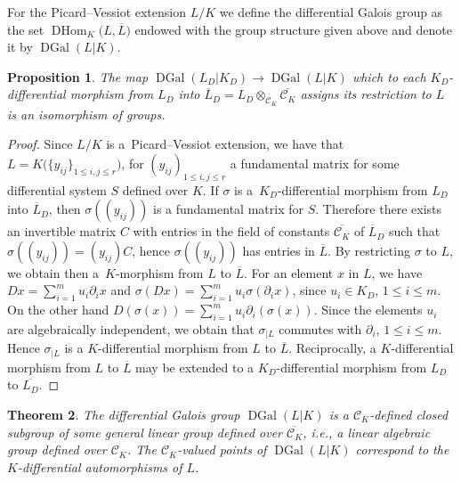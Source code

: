 \documentclass[pdftex]{sigma}%
\numberwithin{equation}{section}
\newtheorem{Theorem}{Theorem}[section]
\newtheorem{Proposition}[Theorem]{Proposition}
 { \theoremstyle{definition}
\newtheorem{Definition}[Theorem]{Definition}
\newtheorem{Note}[Theorem]{Note}
\newtheorem{Example}[Theorem]{Example}
\newtheorem{examples}[Theorem]{Examples}
\newtheorem{Remark}[Theorem]{Remark} }
\def \DGal{\operatorname{DGal}}
\def \DHom{\operatorname{DHom}}
\begin{document}
\begin{Definition} For the Picard--Vessiot extension $L/K$ we define the differential Galois group as the set $\DHom_K\big(L,\overline{L}\big)$ endowed with the group structure given above and denote it by $\DGal(L|K)$.
\end{Definition}

\begin{Proposition}\label{groups}
The map $\DGal(L_D|K_D) \rightarrow \DGal(L|K)$ which to each
$K_D$-differential morphism from $L_D$ into $\overline{L}_D=L_D\otimes_{\mathcal{C}_K} \overline{\mathcal{C}_K}$
assigns its restriction to $L$ is an isomorphism of groups.
\end{Proposition}

\begin{proof} Since $L/K$ is a~Picard--Vessiot extension, we have that $L=K\big( \{y_{ij}\}_{1\leq i,j \leq r} \big)$, for $(y_{ij})_{1\leq i,j \leq r}$ a fundamental matrix for some differential system $S$ defined over $K$. If $\sigma$ is a~$K_D$-differential morphism from $L_D$ into
$\overline{L}_D$, then $\sigma((y_{ij}))$ is a fundamental matrix for $S$. Therefore there exists an invertible matrix $C$ with entries in the field of constants $\overline{\mathcal{C}_K}$ of $\overline{L}_D$ such that $\sigma((y_{ij}))=(y_{ij})C$, hence $\sigma((y_{ij}))$ has entries in $\overline{L}$. By restricting $\sigma$ to $L$, we obtain then a~$K$-morphism from $L$ to $\overline{L}$. For an element $x$ in $L$, we have $Dx=\sum_{i=1}^m u_i \partial_i x$ and $\sigma (Dx)=\sum_{i=1}^m u_i \sigma(\partial_i x)$, since $u_i \in K_D$, $1\leq i \leq m$. On the other hand $D(\sigma(x))=\sum_{i=1}^m u_i \partial_i (\sigma (x))$. Since the elements $u_i$ are algebraically independent, we obtain that $\sigma_{|L}$ commutes with $\partial_i$, $1 \leq i \leq m$. Hence $\sigma_{|L}$ is a $K$-differential morphism from $L$ to $\overline{L}$. Reciprocally, a $K$-differential morphism from $L$ to $\overline{L}$ may be extended to a $K_D$-differential morphism from $L_D$ to $\overline{L_D}$.
\end{proof}

\begin{Theorem}
The differential Galois group $\DGal(L|K)$ is a $\mathcal{C}_K$-defined closed subgroup of some general linear group defined over $\overline{\mathcal{C}_K}$, i.e., a linear algebraic group defined over $\mathcal{C}_K$. The $\mathcal{C}_K$-valued points of $\DGal(L|K)$ correspond to the $K$-differential automorphisms of $L$.
\end{Theorem}
\end{document}

